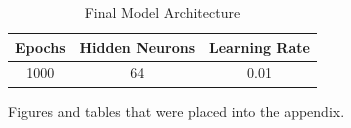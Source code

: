 \documentclass[runningheads]{llncs}
\begin{document}
\begin{table}[ht]
  \centering
  \caption{Final Model Architecture}
  \begin{tabular}{c c c}
    \toprule
    Epochs \quad & Hidden Neurons \quad & Learning Rate \\
    \midrule
    1000 & 64  & 0.01 \\
    \bottomrule
  \end{tabular}
  \label{tab:1AFinalModelArchitecture}
\end{table}

%





Figures and tables that were placed into the appendix.
\end{document}
